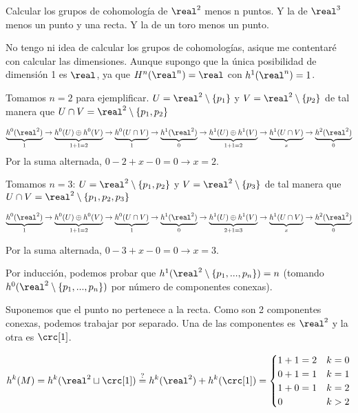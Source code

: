 \begin{problem}[9]

\ppart Calcular los grupos de cohomología de $\real^2$ menos n puntos.
\ppart Y la de $\real^3$ menos un punto y una recta.
\ppart Y la de un toro menos un punto.

\solution
{}

No tengo ni idea de calcular los grupos de cohomologías, asique me contentaré con calcular las dimensiones.
%
Aunque supongo que la única posibilidad de dimensión 1 es $\real$, ya que $H^n(\real^n) = \real$ con $h^1(\real^n) = 1$.

\spart
Tomamos $n=2$ para ejemplificar.
%
$U = \real^2\setminus\{p_1\}$ y $V=\real^2\setminus\{p_2\}$ de tal manera que $U\cap V = \real^2\setminus \{p_1,p_2\}$

\[
	\underbrace{h^0(\real^2)}_{1} \to
	\underbrace{h^0(U)\oplus h^0(V)}_{1+1=2} \to
	\underbrace{h^0(U\cap V)}_{1} \to
	\underbrace{h^1(\real^2)}_{0} \to
	\underbrace{h^1(U)\oplus h^1(V)}_{1+1=2} \to
	\underbrace{h^1(U\cap V)}_{x} \to
	\underbrace{h^2 (\real^2)}_{0}
\]
Por la suma alternada, $0-2+x-0=0 \to x=2$.


Tomamos $n=3$:
%
$U = \real^2\setminus\{p_1,p_2\}$ y $V=\real^2\setminus\{p_3\}$ de tal manera que $U\cap V = \real^2\setminus \{p_1,p_2,p_3\}$

\[
	\underbrace{h^0(\real^2)}_{1} \to
	\underbrace{h^0(U)\oplus h^0(V)}_{1+1=2} \to
	\underbrace{h^0(U\cap V)}_{1} \to
	\underbrace{h^1(\real^2)}_{0} \to
	\underbrace{h^1(U)\oplus h^1(V)}_{2+1=3} \to
	\underbrace{h^1(U\cap V)}_{x} \to
	\underbrace{h^2 (\real^2)}_{0}
\]

Por la suma alternada, $0-3+x-0=0 \to x=3$.

Por inducción, podemos probar que $h^1(\real^2 \setminus\{p_1,...,p_n\}) = n$ (tomando $h^0(\real^2 \setminus\{p_1,...,p_n\})$ por número de componentes conexas).

\spart Suponemos que el punto no pertenece a la recta.
%
Como son 2 componentes conexas, podemos trabajar por separado.
%
Una de las componentes es $\real^2$ y la otra es $\crc[1]$.

\[h^k(M) = h^k(\real^2\sqcup\crc[1]) \overset{?}{=}h^k(\real^2) + h^k(\crc[1]) =
	\begin{cases}
		1+1 = 2 & k=0\\
		0+1 = 1 & k=1\\
		1+0 = 1 & k=2\\
		0 & k>2
	\end{cases}
\]


\spart


\end{problem}

